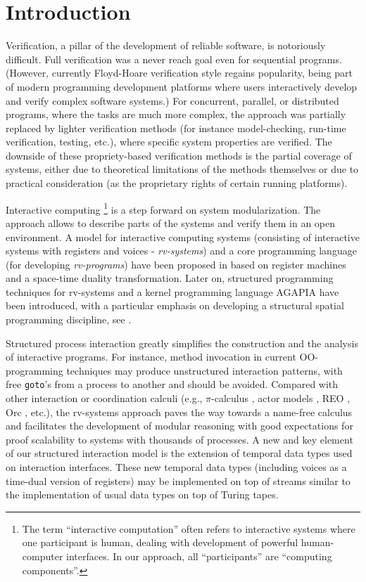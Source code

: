 \documentclass[runningheads]{llncs}
\newcommand{\1}{\u{a}}
\newcommand{\2}{\c{s}}
\newcommand{\5}{\c{t}}
\newcommand{\8}{\^{\i}}
\newcommand{\9}{\^{a}}
\newcommand{\foo}[1]{\footnote{#1}}
\begin{document}
\section{Introduction}\label{s1}

Verification, a pillar of the development of reliable software, is notoriously difficult. Full verification
was a never reach goal even for sequential programs. (However, currently Floyd-Hoare verification style
regains popularity, being part of modern programming development platforms where users interactively develop
and verify complex software systems.) For concurrent, parallel, or distributed programs, where the tasks are
much more complex, the approach was partially replaced by lighter verification methods (for instance
model-checking, run-time verification, testing, etc.), where specific system properties are verified. The
downside of these propriety-based verification methods is the partial coverage of systems, either due to
theoretical limitations of the methods themselves or due to practical consideration (as the proprietary rights
of certain running platforms). 

Interactive computing \cite{gsv06}\foo{The term ``interactive computation'' often refers to interactive
  systems where one participant is human, dealing with development of powerful human-computer interfaces. In
  our approach, all ``participants'' are ``computing components''.} is a step forward on system
modularization. The approach allows to describe parts of the systems and verify them in an open environment. A
model for interactive computing systems (consisting of interactive systems with registers and voices - {\em
  rv-systems}) and a core programming language (for developing {\em rv-programs}) have been proposed in
\cite{ste06a} based on register machines and a space-time duality transformation. Later on, structured
programming techniques for rv-systems and a kernel programming language AGAPIA have been introduced, with a
particular emphasis on developing a structural spatial programming discipline, see \cite{dr-st07b,dr-st08a}.

Structured process interaction greatly simplifies the construction and the analysis of interactive
programs. For instance, method invocation in current OO-programming techniques may produce unstructured
interaction patterns, with free {\tt goto}'s from a process to another and should be avoided. Compared with
other interaction or coordination calculi (e.g., $\pi$-calculus \cite{mil99}, actor models \cite{agha86}, REO
\cite{arb04}, Orc \cite{mi-co07}, etc.), the rv-systems approach paves the way towards a name-free calculus
and facilitates the development of modular reasoning with good expectations for proof scalability to systems
with thousands of processes.  A new and key element of our structured interaction model is the extension of
temporal data types used on interaction interfaces. These new temporal data types (including voices as a
time-dual version of registers) may be implemented on top of streams similar to the implementation of usual
data types on top of Turing tapes.
\end{document}
